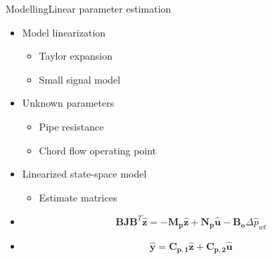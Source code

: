 \begin{frame}{Modelling}{Linear parameter estimation}
\begin{itemize}
	\item<1-> Model linearization
	\begin{itemize}
		\item<1-> Taylor expansion
		\item<1-> Small signal model
	\end{itemize}	
\end{itemize}

\begin{itemize}
	\item<2-> Unknown parameters
	\begin{itemize}
		\item<2-> Pipe resistance
		\item<2-> Chord flow operating point
	\end{itemize}	
\end{itemize}

\begin{itemize}
	\item<3-> Linearized state-space model
	\begin{itemize}
		\item<3-> Estimate matrices
	\end{itemize}
\end{itemize}	

\begin{itemize}
	\item<3->[]
		\begin{equation}
		\pmb{B}\pmb{J {B}}^T \pmb{\dot{\hat{z}}} = -\pmb{M_p} \pmb{\hat{z}} + \pmb{N_p} \pmb{\hat{u}} - \pmb{B_o} \Delta \hat{p}_{wt} 
		\end{equation}
	\item<3->[]
		\begin{equation}
		\pmb{\hat{y}} = \pmb{C_{p,1}} \pmb{\hat{z}}  + \pmb{C_{p,2}}\pmb{\hat{u}}  
		\end{equation}	
\end{itemize}
\end{frame}


